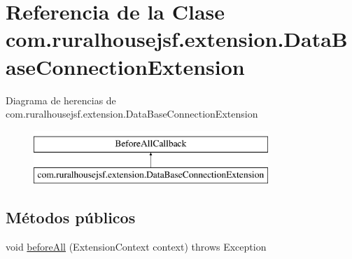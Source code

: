 \hypertarget{classcom_1_1ruralhousejsf_1_1extension_1_1_data_base_connection_extension}{}\section{Referencia de la Clase com.\+ruralhousejsf.\+extension.\+Data\+Base\+Connection\+Extension}
\label{classcom_1_1ruralhousejsf_1_1extension_1_1_data_base_connection_extension}
Diagrama de herencias de com.\+ruralhousejsf.\+extension.\+Data\+Base\+Connection\+Extension\begin{figure}[H]
\begin{center}
\leavevmode
\includegraphics[height=2.000000cm]{dc/deb/classcom_1_1ruralhousejsf_1_1extension_1_1_data_base_connection_extension}
\end{center}
\end{figure}
\subsection*{Métodos públicos}
\begin{DoxyCompactItemize}
\item 
void \mbox{\hyperlink{classcom_1_1ruralhousejsf_1_1extension_1_1_data_base_connection_extension_ae1fe703d5f0bdd5f29f0f4b9f0645e3e}{before\+All}} (Extension\+Context context)  throws Exception 
\end{DoxyCompactItemize}
